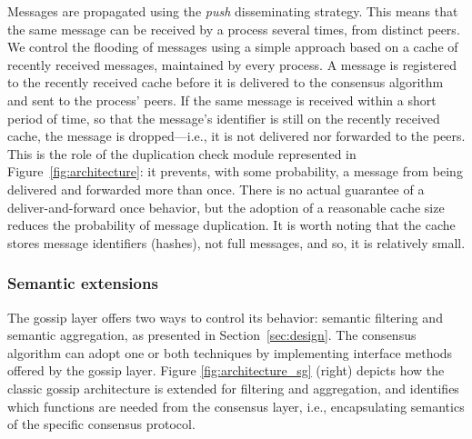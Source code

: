 Messages are propagated using the {\em push} disseminating strategy. 
This means that the same message can be received by a
process several times, from distinct peers.
%
We control the flooding of messages using a simple approach based on a cache of recently received messages, maintained by every process.
%
A message is registered to the recently received cache before it is delivered
to the consensus algorithm and sent to the process' peers.
If the same message is received within a short period of time, so that the message's
identifier is still on the recently received cache, the message is
dropped---i.e., it is not delivered nor forwarded to the peers.
%
This is the role of the duplication check module represented in
Figure~\ref{fig:architecture}: it prevents, with some probability, a message
from being delivered and forwarded more than once. 
%
There is no actual guarantee of a deliver-and-forward once behavior, but the
adoption of a reasonable cache size reduces the probability
of message duplication.
%
It is worth noting that the cache stores message identifiers (hashes), not full messages, and so, it is relatively small.

\subsubsection{Semantic extensions}

The gossip layer offers two ways to control its behavior: semantic filtering and semantic aggregation, as presented in Section~\ref{sec:design}.
The consensus algorithm can adopt one or both techniques by implementing interface methods offered by the gossip layer.   
Figure \ref{fig:architecture_sg} (right) depicts how the classic gossip architecture is extended for filtering and aggregation, and identifies which functions are needed from the consensus layer, i.e., encapsulating semantics of the specific consensus protocol.

